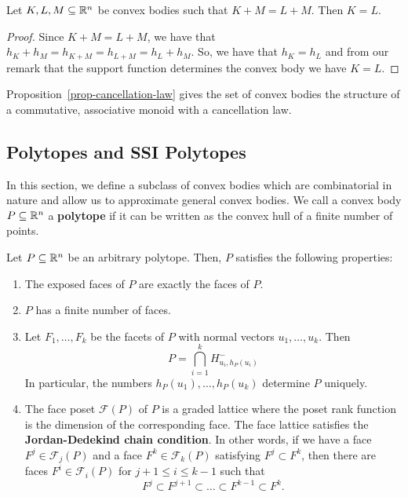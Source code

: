 \documentclass{puthesis-UG}
\begin{document}
\begin{prop}  \label{prop-cancellation-law}
	Let $K, L, M \subseteq \mathbb{R}^n$ be convex bodies such that $K+M = L+M$. Then $K = L$. 
\end{prop}

\begin{proof}
	Since $K+M = L+M$, we have that $h_K + h_M = h_{K+M} = h_{L+M} = h_L + h_M$. So, we have that $h_K = h_L$ and from our remark that the support function determines the convex body we have $K = L$.
\end{proof}

Proposition~\ref{prop-cancellation-law} gives the set of convex bodies the structure of a commutative, associative monoid with a cancellation law. 


\subsection{Polytopes and SSI Polytopes} \label{sec:polytopes}

In this section, we define a subclass of convex bodies which are combinatorial in nature and allow us to approximate general convex bodies. We call a convex body $P \subseteq \mathbb{R}^n$ a \textbf{polytope} if it can be written as the convex hull of a finite number of points. 

\begin{prop}
	Let $P \subseteq \mathbb{R}^n$ be an arbitrary polytope. Then, $P$ satisfies the following properties: 
	\begin{enumerate}[label = (\alph*)]
		\item The exposed faces of $P$ are exactly the faces of $P$. 
		\item $P$ has a finite number of faces. 
		\item Let $F_1, \ldots, F_k$ be the facets of $P$ with normal vectors $u_1, \ldots, u_k$. Then 
		\[
			P = \bigcap_{i = 1}^k H_{u_i, h_P(u_i)}^-
		\]
		In particular, the numbers $h_P(u_1), \ldots, h_P(u_k)$ determine $P$ uniquely. 

		\item The face poset $\mathcal{F}(P)$ of $P$ is a graded lattice where the poset rank function is the dimension of the corresponding face. The face lattice satisfies the \textbf{Jordan-Dedekind chain condition}. In other words, if we have a face $F^j \in \mathcal{F}_j(P)$ and a face $F^k \in \mathcal{F}_k(P)$ satisfying $F^j \subset F^k$, then there are faces $F^i \in \mathcal{F}_i(P)$ for $j+1 \leq i \leq k-1$ such that 
		\[
			F^j \subset F^{j+1} \subset \ldots \subset F^{k-1} \subset F^k.
		\]
	\end{enumerate}
\end{prop}
\end{document}
